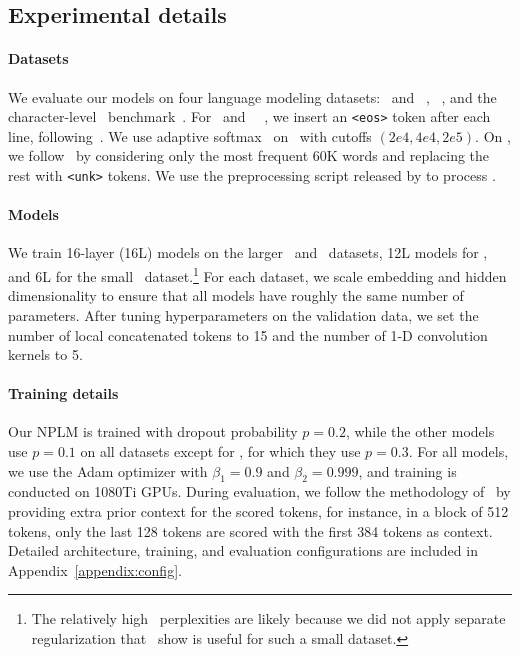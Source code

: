 \documentclass[11pt]{article}
\begin{document}
\subsection{Experimental details}

\paragraph{Datasets} We evaluate our models on four language modeling datasets: \wttwo\ and \wtthree~\citep{merity2016pointer}, \lambada~\citep{paperno-etal-2016-lambada}, and the character-level  \enwik\ benchmark~\citep{merity2017regularizing}. 
For \wttwo\ and \wtthree\ ~\cite{merity2016pointer}, we insert an \texttt{<eos>} token after each line, following~\citet{merity2018analysis}. We use adaptive softmax~\cite{pmlr-v70-grave17a} on \wtthree\ with cutoffs $(2e4, 4e4, 2e5)$. On \lambada, we follow~\citet{paperno-etal-2016-lambada} by considering only the most frequent 60K words and replacing the rest with \texttt{<unk>} tokens. We use the preprocessing script released by \citet{merity2017regularizing} to process \enwik.



\paragraph{Models} We train 16-layer (16L) models on the larger \wtthree\ and \lambada\ datasets, 12L models for \enwik, and 6L for the small \wttwo\ dataset.\footnote{The relatively high \wttwo\ perplexities are likely because we did not apply separate regularization that~\citet{merity2017regularizing} show is useful for such a small dataset.} For each dataset, we scale embedding and hidden dimensionality to ensure that all models have roughly the same number of parameters. After tuning hyperparameters on the validation data, we set the number of local concatenated tokens to 15 and the number of 1-D convolution kernels to 5. 

\paragraph{Training details} Our NPLM is trained with dropout probability $p=0.2$, while the other models use $p=0.1$ on all datasets except for \wttwo, for which they use $p=0.3$. For all models, we use the Adam optimizer with $\beta_1 = 0.9$ and $\beta_2 = 0.999$, and training is conducted on 1080Ti GPUs. During evaluation, we follow the methodology of~\cite{knnlm} by providing extra prior context for the scored tokens, 
for instance, in a block of 512 tokens, only the last 128 tokens are scored with the first 384 tokens as context. Detailed architecture, training, and evaluation configurations are included in Appendix~\ref{appendix:config}.
\end{document}
